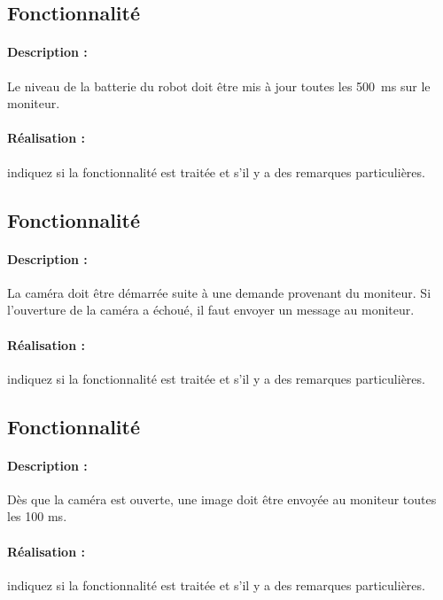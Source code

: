 \documentclass[11pt, a4paper]{paper}
\newcounter{cptreq}
\begin{document}
\subsection{Fonctionnalité \thecptreq}

\paragraph{Description :} Le niveau de la batterie du robot doit être mis à jour toutes les 500~ms sur le moniteur.

\paragraph{\color{black}Réalisation :}  {\color{red} indiquez si la fonctionnalité est traitée et s'il y a des remarques particulières.}
\subsection{Fonctionnalité \thecptreq}

\paragraph{Description :} La caméra doit être démarrée suite à une demande provenant du moniteur. Si l'ouverture de la  caméra a échoué, il faut envoyer un message au moniteur.

\paragraph{\color{black}Réalisation :}  {\color{red} indiquez si la fonctionnalité est traitée et s'il y a des remarques particulières.}
\subsection{Fonctionnalité \thecptreq}

\paragraph{Description :} Dès que la caméra est ouverte, une image doit être envoyée au moniteur toutes les 100 ms.

\paragraph{\color{black}Réalisation :}  {\color{red} indiquez si la fonctionnalité est traitée et s'il y a des remarques particulières.}
\end{document}
